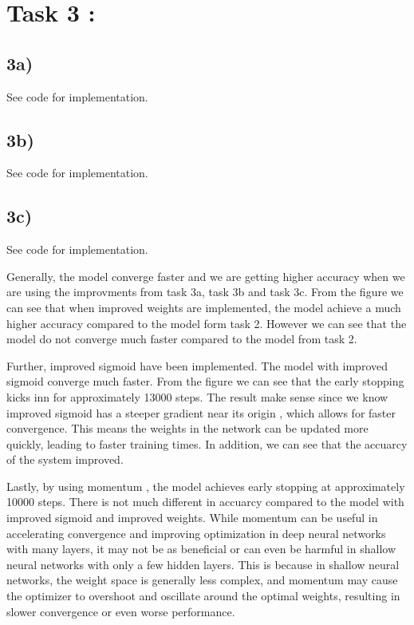 \documentclass{article}
\begin{document}
\section*{Task 3 :}
\subsection*{3a)}
See code for implementation.
\subsection*{3b)}
See code for implementation.
\subsection*{3c)}
See code for implementation.
\newline

Generally, the model converge faster and we are getting higher accuracy when we are using the improvments from task 3a, task 3b and task 3c.
From the figure we can see that when improved weights  are implemented, the model achieve a much higher accuracy compared to the model form task 2. However we
can see that the model do not converge much faster compared to the model from task 2. 

Further, improved sigmoid have been implemented.  The model with improved sigmoid converge much faster. From the figure we can see that the early stopping kicks inn for approximately 13000 steps.
The result make sense since we know improved sigmoid has a steeper gradient near its origin , which allows for faster convergence. This means
the weights in the network can be updated more quickly, leading to faster training times. 
In addition, we can see that the accuarcy of the system improved. 

Lastly, by using momentum , the model achieves early stopping at approximately 10000 steps. There is not much different in accuarcy compared to the model with improved sigmoid and improved weights. 
While momentum can be useful in accelerating convergence and improving optimization in deep neural networks with many layers, it may not be as beneficial or can even be harmful in shallow neural networks with only a few hidden layers. 
This is because in shallow neural networks, the weight space is generally less complex, and momentum may cause the optimizer to overshoot and oscillate around the optimal weights, resulting in slower convergence or even worse performance.
\end{document}
